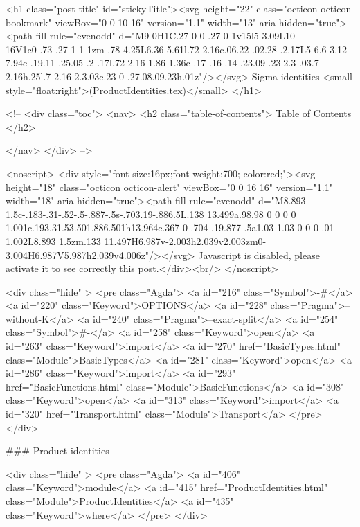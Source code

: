   <h1 class="post-title" id="stickyTitle"><svg height="22" class="octicon octicon-bookmark" viewBox="0 0 10 16" version="1.1" width="13" aria-hidden="true"><path fill-rule="evenodd" d="M9 0H1C.27 0 0 .27 0 1v15l5-3.09L10 16V1c0-.73-.27-1-1-1zm-.78 4.25L6.36 5.61l.72 2.16c.06.22-.02.28-.2.17L5 6.6 3.12 7.94c-.19.11-.25.05-.2-.17l.72-2.16-1.86-1.36c-.17-.16-.14-.23.09-.23l2.3-.03.7-2.16h.25l.7 2.16 2.3.03c.23 0 .27.08.09.23h.01z"/></svg> Sigma identities <small style="float:right">(ProductIdentities.tex)</small>
  </h1>

  <!-- 
  <div class="toc">
    <nav>
    <h2 class="table-of-contents"> Table of Contents </h2>
      

    </nav>
  </div>
   -->

  <noscript>
  <div style="font-size:16px;font-weight:700; color:red;"><svg height="18" class="octicon octicon-alert" viewBox="0 0 16 16" version="1.1" width="18" aria-hidden="true"><path fill-rule="evenodd" d="M8.893 1.5c-.183-.31-.52-.5-.887-.5s-.703.19-.886.5L.138 13.499a.98.98 0 0 0 0 1.001c.193.31.53.501.886.501h13.964c.367 0 .704-.19.877-.5a1.03 1.03 0 0 0 .01-1.002L8.893 1.5zm.133 11.497H6.987v-2.003h2.039v2.003zm0-3.004H6.987V5.987h2.039v4.006z"/></svg> Javascript is disabled, please activate it to see correctly this post.</div><br/>
  </noscript>

  <div class="hide" >
<pre class="Agda">
<a id="216" class="Symbol">{-#</a> <a id="220" class="Keyword">OPTIONS</a> <a id="228" class="Pragma">--without-K</a> <a id="240" class="Pragma">--exact-split</a> <a id="254" class="Symbol">#-}</a>
<a id="258" class="Keyword">open</a> <a id="263" class="Keyword">import</a> <a id="270" href="BasicTypes.html" class="Module">BasicTypes</a>
<a id="281" class="Keyword">open</a> <a id="286" class="Keyword">import</a> <a id="293" href="BasicFunctions.html" class="Module">BasicFunctions</a>
<a id="308" class="Keyword">open</a> <a id="313" class="Keyword">import</a> <a id="320" href="Transport.html" class="Module">Transport</a>
</pre>
</div>

### Product identities

<div class="hide" >
<pre class="Agda">
<a id="406" class="Keyword">module</a>
  <a id="415" href="ProductIdentities.html" class="Module">ProductIdentities</a>
  <a id="435" class="Keyword">where</a>
</pre>
</div>


